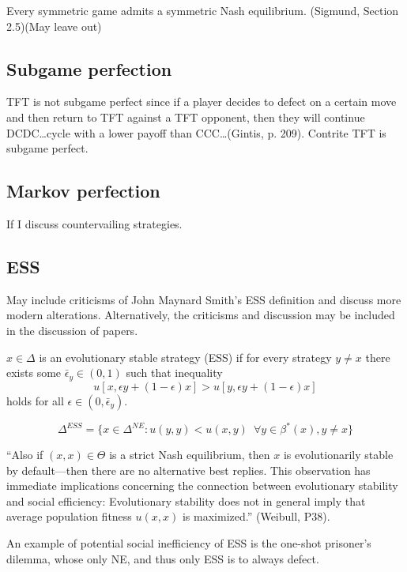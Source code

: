 \begin{theorem}
Every symmetric game admits a symmetric Nash equilibrium. (Sigmund, Section 2.5)(May leave out)
\end{theorem}
\subsection{Subgame perfection}

TFT is not subgame perfect since if a player decides to defect on a certain move and then return to TFT against a TFT opponent, then they will continue DCDC\dots cycle with a lower payoff than CCC\dots (Gintis, p. 209). Contrite TFT is subgame perfect.

\subsection{Markov perfection}
If I discuss countervailing strategies. 
 
\subsection{ESS}
May include criticisms of John Maynard Smith's ESS definition and discuss more modern alterations. Alternatively, the criticisms and discussion may be included in the discussion of papers.
\begin{definition}$x \in \Delta$ is an evolutionary stable strategy (ESS) if for every strategy $y \neq x$ there exists some $\bar{\epsilon}_y \in (0, 1)$ such that inequality
\[
u[x, \epsilon y + (1-\epsilon) x ] > u [ y, \epsilon y + (1- \epsilon) x]
\]
holds for all $\epsilon \in (0, \bar{\epsilon}_y)$.
\end{definition}
\begin{proposition}
\[
\Delta^{ESS} = \{ x \in \Delta^{NE} : u(y, y) < u(x, y) \enspace \forall y \in \beta^* (x), y \neq x \}
\]
\end{proposition}


``Also if $(x, x) \in \Theta$ is a strict Nash equilibrium, then $x$ is evolutionarily stable by default---then there are no alternative best replies. This observation has immediate implications concerning the connection between evolutionary stability and social efficiency: Evolutionary stability does not in general imply that average population fitness $u(x, x)$ is maximized.'' (Weibull, P38).

An example of potential social inefficiency of ESS is the one-shot prisoner's dilemma, whose only NE, and thus only ESS is to always defect.

